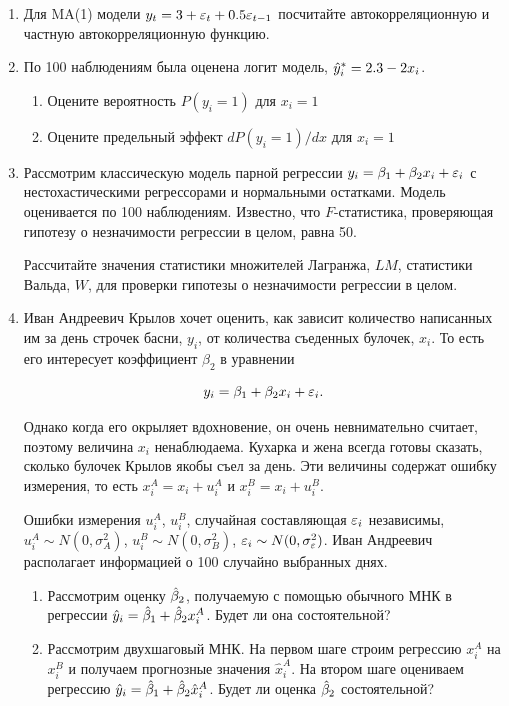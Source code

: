 \documentclass[12pt, a4paper]{article}\usepackage[]{graphicx}\usepackage[]{color}
\begin{document}
\begin{enumerate}
\item Для MA(1) модели $y_t=3+\varepsilon_t+0.5\varepsilon_{t-1}$ посчитайте автокорреляционную и частную автокорреляционную функцию.

\item По 100 наблюдениям была оценена логит модель, $\hat{y}_i^*=2.3-2x_i$.
\begin{enumerate}
\item Оцените вероятность $P(y_i=1)$ для $x_i=1$
\item Оцените предельный эффект $dP(y_i=1)/dx$ для $x_i=1$
\end{enumerate}

\item Рассмотрим классическую модель парной регрессии $y_i=\beta_1 + \beta_2 x_i + \varepsilon_i$ с нестохастическими регрессорами и нормальными остатками. Модель оценивается по 100 наблюдениям. Известно, что $F$-статистика, проверяющая гипотезу о незначимости регрессии в целом, равна 50.

Рассчитайте значения статистики множителей Лагранжа, $LM$, статистики Вальда, $W$, для проверки гипотезы о незначимости регрессии в целом.


\item Иван Андреевич Крылов хочет оценить, как зависит количество написанных им за день строчек басни, $y_i$, от количества съеденных булочек, $x_i$. То есть его интересует коэффициент $\beta_2$ в уравнении

\[
y_i=\beta_1+\beta_2 x_i + \varepsilon_i.
\]

Однако когда его окрыляет вдохновение, он очень невнимательно считает, поэтому величина $x_i$ ненаблюдаема. Кухарка и жена всегда готовы сказать, сколько булочек Крылов якобы съел за день. Эти величины содержат ошибку измерения, то есть $x_i^A=x_i+u_i^A$ и $x_i^B=x_i+u_i^B$.

Ошибки измерения $u_i^A$, $u_i^B$, случайная составляющая $\varepsilon_i$ независимы, $u_i^A \sim N(0,\sigma^2_A)$, $u_i^B \sim N(0,\sigma^2_B)$, $\varepsilon_i \sim N(0,\sigma^2_{\varepsilon})$. Иван Андреевич располагает информацией о 100 случайно выбранных днях.

\begin{enumerate}
\item Рассмотрим оценку $\hat{\beta}_2$, получаемую с помощью обычного МНК в регрессии $\hat{y}_i=\hat{\beta}_1+\hat{\beta}_2 x_i^A$. Будет ли она состоятельной?
\item Рассмотрим двухшаговый МНК. На первом шаге строим регрессию $x_i^A$ на $x_i^B$ и получаем прогнозные значения $\hat{x}_i^A$. На втором шаге  оцениваем регрессию $\hat{y}_i=\hat{\beta}_1+\hat{\beta}_2 \hat{x}_i^A$. Будет ли оценка $\hat{\beta}_2$ состоятельной?
\end{enumerate}



\end{enumerate}
\end{document}
